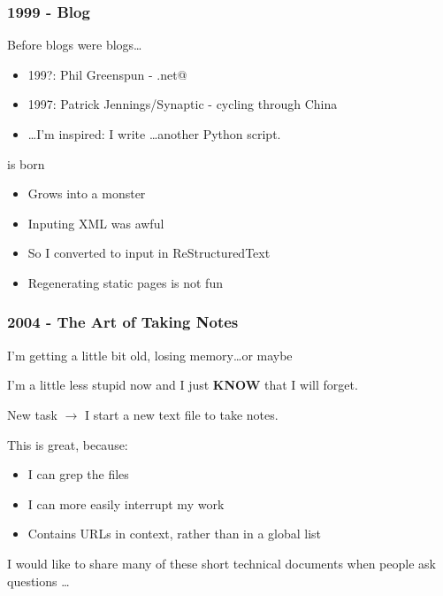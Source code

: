 \documentclass[compress,trans]{beamer}
\begin{document}
\begin{frame}[fragile]
  \frametitle{1999 - Blog}

  Before blogs were blogs\dots

  \begin{itemize}
  \item 199?: Phil Greenspun - \verb@photo.net@
  \item 1997: Patrick Jennings/Synaptic - cycling through China
  \item \dots I'm inspired: I write \dots another Python script.
  \end{itemize}

\vfill\pause

  \verb@adventures@ is born
  \begin{itemize}
    \item Grows into a monster
    \item Inputing XML was awful
    \item So I converted to input in ReStructuredText
    \item Regenerating static pages is not fun
  \end{itemize}

\end{frame}



% 
% 


\begin{frame}[fragile]
  \frametitle{2004 - The Art of Taking Notes}

  I'm getting a little bit old, losing memory\dots  \pause or maybe \\

\vfill

  I'm a little less stupid now and I just \textbf{KNOW} that I will forget. \\

\vfill\pause

  New task $\rightarrow$ I start a new text file to take notes.

  This is great, because:
  \begin{itemize}
    \item I can grep the files

    \item I can more easily interrupt my work

    \item Contains URLs in context, rather than in a global list

  \end{itemize}

  I would like to share many of these short technical documents when people
  ask questions \dots

\end{frame}
\end{document}

